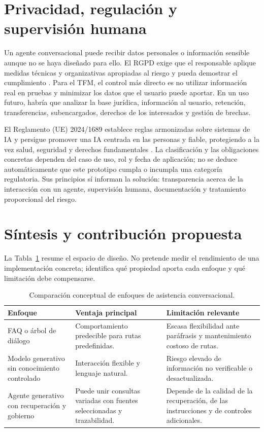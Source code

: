 \section{Privacidad, regulación y supervisión humana}
\label{sec:privacidad-regulacion}

Un agente conversacional puede recibir datos personales o información sensible
aunque no se haya diseñado para ello. El RGPD exige que el responsable aplique
medidas técnicas y organizativas apropiadas al riesgo y pueda demostrar el
cumplimiento \cite{gdpr}. Para el TFM, el control más directo es no utilizar
información real en pruebas y minimizar los datos que el usuario puede aportar.
En un uso futuro, habría que analizar la base jurídica, información al usuario,
retención, transferencias, subencargados, derechos de los interesados y gestión
de brechas.

El Reglamento (UE) 2024/1689 establece reglas armonizadas sobre sistemas de IA y
persigue promover una IA centrada en las personas y fiable, protegiendo a la vez
salud, seguridad y derechos fundamentales \cite{aiAct}. La clasificación y las
obligaciones concretas dependen del caso de uso, rol y fecha de aplicación; no se
deduce automáticamente que este prototipo cumpla o incumpla una categoría
regulatoria. Sus principios sí informan la solución: transparencia acerca de la
interacción con un agente, supervisión humana, documentación y tratamiento
proporcional del riesgo.

\section{Síntesis y contribución propuesta}
\label{sec:sintesis-estado-arte}

La Tabla~\ref{tab:comparacion-enfoques} resume el espacio de diseño. No pretende
medir el rendimiento de una implementación concreta; identifica qué propiedad
aporta cada enfoque y qué limitación debe compensarse.

\begin{table}[H]
\centering
\caption{Comparación conceptual de enfoques de asistencia conversacional.}
\label{tab:comparacion-enfoques}
\begin{tabular}{p{}p{}p{}}
\hline
\textbf{Enfoque} & \textbf{Ventaja principal} & \textbf{Limitación relevante}\\
\hline
FAQ o árbol de diálogo & Comportamiento predecible para rutas predefinidas. &
Escasa flexibilidad ante paráfrasis y mantenimiento costoso de rutas.\\
Modelo generativo sin conocimiento controlado & Interacción flexible y lenguaje
natural. & Riesgo elevado de información no verificable o desactualizada.\\
Agente generativo con recuperación y gobierno & Puede unir consultas variadas con
fuentes seleccionadas y trazabilidad. & Depende de la calidad de la recuperación,
de las instrucciones y de controles adicionales.\\
\hline
\end{tabular}
\end{table}

